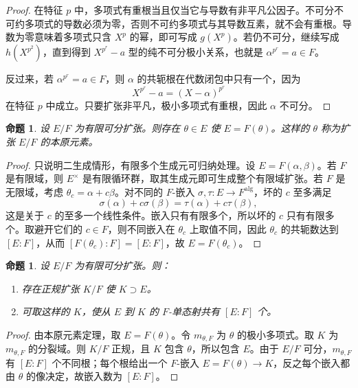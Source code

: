 \documentclass[11pt,a4paper,openany]{ctexbook}
\numberwithin{equation}{chapter}
\theoremstyle{plain}
\newtheorem{proposition}[theorem]{命题}
\theoremstyle{definition}
\theoremstyle{remark}
\begin{document}
\begin{proof}
在特征 $p$ 中，多项式有重根当且仅当它与导数有非平凡公因子。不可分不可约多项式的导数必须为零，否则不可约多项式与其导数互素，就不会有重根。导数为零意味着多项式只含 $X^p$ 的幂，即可写成 $g(X^p)$。若仍不可分，继续写成 $h(X^{p^2})$，直到得到 $X^{p^r}-a$ 型的纯不可分极小关系，也就是 $\alpha^{p^r}=a\in F$。

反过来，若 $\alpha^{p^r}=a\in F$，则 $\alpha$ 的共轭根在代数闭包中只有一个，因为
\[
X^{p^r}-a=(X-\alpha)^{p^r}
\]
在特征 $p$ 中成立。只要扩张非平凡，极小多项式有重根，因此 $\alpha$ 不可分。
\end{proof}

\begin{proposition}
设 $E/F$ 为有限可分扩张。则存在 $\theta\in E$ 使 $E=F(\theta)$。这样的 $\theta$ 称为扩张 $E/F$ 的本原元素。
\end{proposition}

\begin{proof}
只说明二生成情形，有限多个生成元可归纳处理。设 $E=F(\alpha,\beta)$。若 $F$ 是有限域，则 $E^\times$ 是有限循环群，取其生成元即可生成整个有限域扩张。若 $F$ 是无限域，考虑 $\theta_c=\alpha+c\beta$。对不同的 $F$-嵌入 $\sigma,\tau:E\to F^{\mathrm{alg}}$，坏的 $c$ 至多满足
\[
\sigma(\alpha)+c\sigma(\beta)=\tau(\alpha)+c\tau(\beta),
\]
这是关于 $c$ 的至多一个线性条件。嵌入只有有限多个，所以坏的 $c$ 只有有限多个。取避开它们的 $c\in F$，则不同嵌入在 $\theta_c$ 上取值不同，因此 $\theta_c$ 的共轭数达到 $[E:F]$，从而 $[F(\theta_c):F]=[E:F]$，故 $E=F(\theta_c)$。
\end{proof}

\begin{proposition}
设 $E/F$ 为有限可分扩张。则：
\begin{enumerate}[label=(\arabic*)]
\item 存在正规扩张 $K/F$ 使 $K\supset E$。
\item 可取这样的 $K$，使从 $E$ 到 $K$ 的 $F$-单态射共有 $[E:F]$ 个。
\end{enumerate}
\end{proposition}

\begin{proof}
由本原元素定理，取 $E=F(\theta)$。令 $m_{\theta,F}$ 为 $\theta$ 的极小多项式。取 $K$ 为 $m_{\theta,F}$ 的分裂域。则 $K/F$ 正规，且 $K$ 包含 $\theta$，所以包含 $E$。由于 $E/F$ 可分，$m_{\theta,F}$ 有 $[E:F]$ 个不同根；每个根给出一个 $F$-嵌入 $E=F(\theta)\to K$，反之每个嵌入都由 $\theta$ 的像决定，故嵌入数为 $[E:F]$。
\end{proof}
\end{document}
